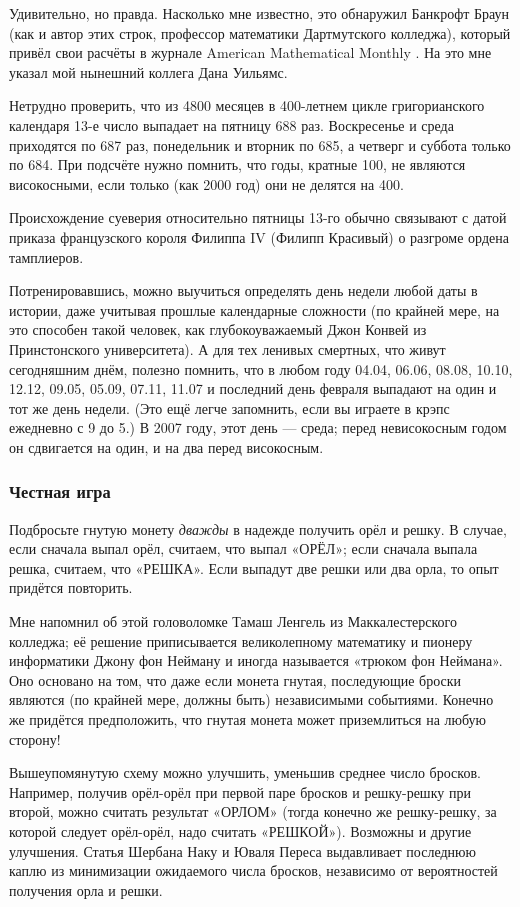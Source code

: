 Удивительно, но правда.
Насколько мне известно, это обнаружил Банкрофт Браун (как и автор этих строк, профессор математики Дартмутского колледжа), который привёл свои расчёты в журнале American Mathematical Monthly \cite{11}.
На это мне указал мой нынешний коллега Дана Уильямс.

Нетрудно проверить, что из 4800 месяцев в 400-летнем цикле григорианского календаря 13-е число выпадает на пятницу 688 раз.
Воскресенье и среда приходятся по 687 раз, понедельник и вторник по 685, а четверг и суббота только по 684.
При подсчёте нужно помнить, что годы, кратные 100, не являются високосными, если только (как 2000 год) они не делятся на 400.

Происхождение суеверия относительно пятницы 13-го обычно связывают с датой приказа французского короля Филиппа IV (Филипп Красивый) о разгроме ордена тамплиеров.

Потренировавшись, можно выучиться определять день недели любой даты в истории, даже учитывая прошлые календарные сложности
(по крайней мере, на это способен такой человек, как глубокоуважаемый Джон Конвей из Принстонского университета).
А для тех ленивых смертных, что живут сегодняшним днём, полезно помнить, что в любом году
04.04, 06.06, 08.08, 10.10, 12.12, 09.05, 05.09, 07.11, 11.07 и последний день февраля выпадают на один и тот же день недели.
(Это ещё легче запомнить, если вы играете в крэпс ежедневно с 9 до 5.)
В 2007 году, этот день --- среда;
перед невисокосным годом он сдвигается на один, и на два перед високосным.


\subsubsection*{Честная игра}

Подбросьте гнутую монету \emph{дважды} в надежде получить орёл и решку.
В случае, если сначала выпал орёл, считаем, что выпал «ОРЁЛ»;
если сначала выпала решка, считаем, что «РЕШКА».
Если выпадут две решки или два орла, то опыт придётся повторить.

Мне напомнил об этой головоломке Тамаш Ленгель из Маккалестерского колледжа;
её решение приписывается великолепному математику и пионеру информатики  Джону фон Нейману и иногда называется «трюком фон Неймана».
Оно основано на том, что даже если монета гнутая, последующие броски являются (по крайней мере, должны быть) независимыми событиями.
Конечно же придётся предположить, что гнутая монета может приземлиться на любую сторону!

Вышеупомянутую схему можно улучшить, уменьшив среднее число бросков.
Например, получив орёл-орёл при первой паре бросков и решку-решку при второй, можно считать результат «ОРЛОМ» (тогда конечно же решку-решку, за которой следует орёл-орёл, надо считать «РЕШКОЙ»).
Возможны и другие улучшения.
Статья Шербана Наку и Юваля Переса \cite{44} выдавливает последнюю каплю из минимизации ожидаемого числа бросков, независимо от вероятностей получения орла и решки.

